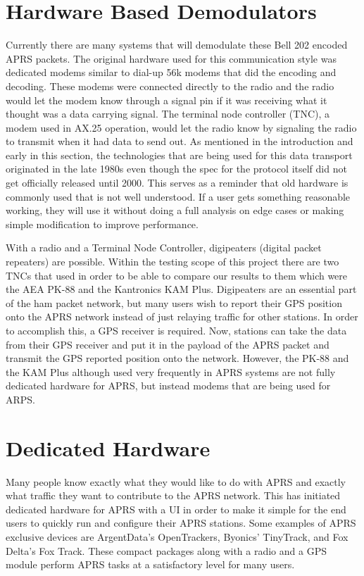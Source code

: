 \section{Hardware Based Demodulators}

Currently there are many systems that will demodulate these Bell 202 encoded APRS packets. The original hardware used for this communication style was dedicated modems similar to dial-up 56k modems that did the encoding and decoding. These modems were connected directly to the radio and the radio would let the modem know through a signal pin if it was receiving what it thought was a data carrying signal. The terminal node controller (TNC), a modem used in AX.25 operation, would let the radio know by signaling the radio to transmit when it had data to send out. As mentioned in the introduction and early in this section, the technologies that are being used for this data transport originated in the late 1980s even though the spec for the protocol itself did not get officially released until 2000. This serves as a reminder that old hardware is commonly used that is not well understood. If a user gets something reasonable working, they will use it without doing a full analysis on edge cases or making simple modification to improve performance.

With a radio and a Terminal Node Controller, digipeaters (digital packet repeaters) are possible. Within the testing scope of this project there are two TNCs that used in order to be able to compare our results to them which were the AEA PK-88 and the Kantronics KAM Plus. Digipeaters are an essential part of the ham packet network, but many users wish to report their GPS position onto the APRS network instead of just relaying traffic for other stations. In order to accomplish this, a GPS receiver is required. Now, stations can take the data from their GPS receiver and put it in the payload of the APRS packet and transmit the GPS reported position onto the network. However, the PK-88 and the KAM Plus although used very frequently in APRS systems are not fully dedicated hardware for APRS, but instead modems that are being used for ARPS.

\section{Dedicated Hardware}

Many people know exactly what they would like to do with APRS and exactly what traffic they want to contribute to the APRS network. This has initiated dedicated hardware for APRS with a UI in order to make it simple for the end users to quickly run and configure their APRS stations. Some examples of APRS exclusive devices are ArgentData’s OpenTrackers, Byonics’ TinyTrack, and Fox Delta’s Fox Track. These compact packages along with a radio and a GPS module perform APRS tasks at a satisfactory level for many users.

